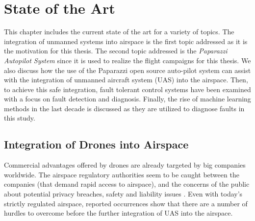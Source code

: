 
{}

\chapter{State of the Art}

This chapter includes the current state of the art for a variety of topics.
The integration of unmanned systems into airspace is the first topic addressed as it is the motivation for this thesis.
The second topic addressed is the \emph{Paparazzi Autopilot System} since it is used to realize the flight campaigns for this thesis. 
We also discuss how the use of the Paparazzi open source auto-pilot system can assist with the integration of unmanned aircraft system (UAS) into the airspace. 
Then, to achieve this safe integration, fault tolerant control systems have been examined with a focus on fault detection and diagnosis.
Finally, the rise of machine learning methods in the last decade is discussed as they are utilized to diagnose faults in this study.

\section{Integration of Drones into Airspace}

Commercial advantages offered by drones are already targeted by big companies worldwide. 
The airspace regulatory authorities seem to be caught between the companies (that demand rapid access to airspace), and the concerns of the public about potential privacy breaches, 
safety and liability issues \cite{droneDisasters,droneImageProblem}. 
Even with today's strictly regulated airspace, reported occurrences show that there are a number of hurdles to overcome before the further integration of UAS into the airspace.

